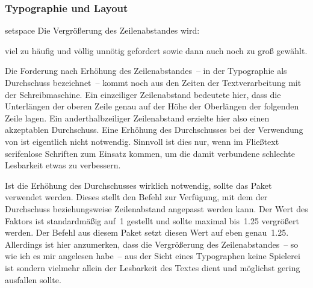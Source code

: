 \documentclass[%
  english,ngerman,%
  headings=optiontoheadandtoc,captions=tableheading,numbers=noenddot,%
  chapterpage,cdfoot,%
]{tudscrman}
\begin{document}
\subsubsection{Typographie und Layout}
\begin{packages}
\item[setspace]
  Die Vergrößerung des Zeilenabstandes wird:
  \begin{enumerate}[itemindent=0pt,labelwidth=*,labelsep=1em,label=\Roman*.]
  \makeatletter
  \item@packages viel zu häufig und völlig unnötig gefordert sowie
  \item@packages dann auch noch zu groß gewählt.
  \makeatother
  \end{enumerate}
  Die Forderung nach Erhöhung des Zeilenabstandes~-- in der Typographie als 
  Durchschuss bezeichnet~-- kommt noch aus den Zeiten der Textverarbeitung mit 
  der Schreibmaschine. Ein einzeiliger Zeilenabstand bedeutete hier, dass die 
  Unterlängen der oberen Zeile genau auf der Höhe der Oberlängen der folgenden 
  Zeile lagen. Ein anderthalbzeiliger Zeilenabstand erzielte hier also einen 
  akzeptablen Durchschuss. Eine Erhöhung des Durchschusses bei der Verwendung 
  von  ist eigentlich nicht notwendig. Sinnvoll ist dies nur, wenn 
  im Fließtext serifenlose Schriften zum Einsatz kommen, um die damit verbundene 
  schlechte Lesbarkeit etwas zu verbessern.
  
  Ist die Erhöhung des Durchschusses wirklich notwendig, sollte das Paket 
   verwendet werden. Dieses stellt den Befehl 
   zur Verfügung, mit dem der Durchschuss 
  beziehungsweise Zeilenabstand angepasst werden kann. Der Wert des Faktors 
  ist standardmäßig auf~1 gestellt und sollte maximal bis~1.25 vergrößert 
  werden. Der Befehl  aus diesem Paket setzt diesen Wert 
  auf eben genau~1.25. Allerdings ist hier anzumerken, dass die Vergrößerung des 
  Zeilenabstandes~-- so wie ich es mir angelesen habe~-- aus der Sicht eines 
  Typographen keine Spielerei ist sondern vielmehr allein der Lesbarkeit des 
  Textes dient und möglichst gering ausfallen sollte.
  

\end{packages}
\end{document}
